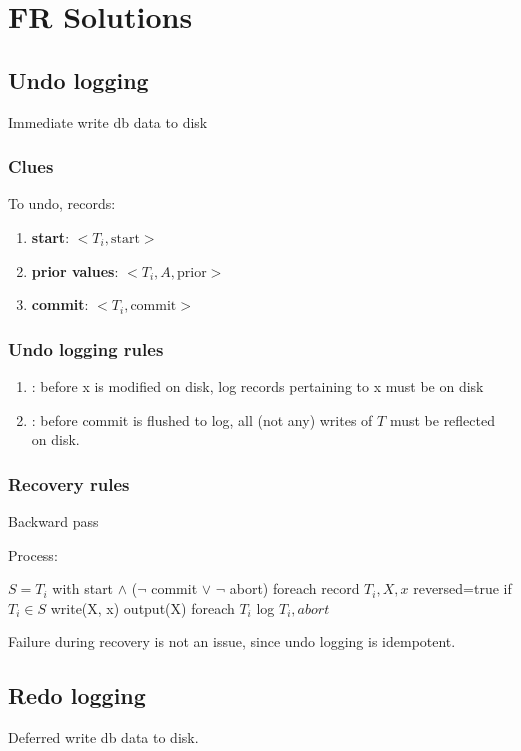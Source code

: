 \documentclass[a4paper]{report}
\begin{document}
\section{FR Solutions}
\subsection{Undo logging}
Immediate write db data to disk
\subsubsection{Clues}
To undo, records:
\begin{enumerate}
\item \textbf{start}: $<T_i, \text{start}>$
\item \textbf{prior values}: $<T_i, A, \text{prior}>$
\item \textbf{commit}: $<T_i, \text{commit}>$
\end{enumerate}

\subsubsection{Undo logging rules}
\begin{enumerate}
\item {}: before x is modified on disk, log records pertaining to x must be on disk
\item {}: before commit is flushed to log, all (not any) writes of $T$ must be reflected on disk.
\end{enumerate}

\newpage
\subsubsection{Recovery rules}
Backward pass

Process:
\begin{pseudo}
$S = T_i$ with start $\wedge$ ($\neg$ commit $\vee$ $\neg$ abort)
foreach record $T_i, X, x$ reversed=true
  if $T_i \in S$
    write(X, x)
    output(X)
foreach $T_i$
  log $T_i, abort$
\end{pseudo}
Failure during recovery is not an issue, since undo logging is idempotent.



\subsection{Redo logging}
Deferred write db data to disk.
\end{document}
